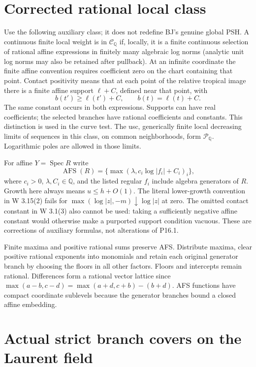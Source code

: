 \documentclass[
  11pt,
]{article}
\begin{document}
\section{Corrected rational local
class}\label{corrected-rational-local-class}

Use the following auxiliary class; it does not redefine BJ's genuine
global PSH. A continuous finite local weight is in
\(\mathcal C_{\mathbb Q}\) if, locally, it is a finite continuous
selection of rational affine expressions in finitely many algebraic log
norms (analytic unit log norms may also be retained after pullback). At
an infinite coordinate the finite affine convention requires coefficient
zero on the chart containing that point. Contact positivity means that
at each point of the relative tropical image there is a finite affine
support \(\ell+C\), defined near that point, with
\[b(t')\ge\ell(t')+C,\qquad b(t)=\ell(t)+C. \tag{9}\] The same constant
occurs in both expressions. Supports can have real coefficients; the
selected branches have rational coefficients and constants. This
distinction is used in the curve test. The usc, generically finite local
decreasing limits of sequences in this class, on common neighborhoods,
form \(\mathcal P_{\mathbb Q}\). Logarithmic poles are allowed in those
limits.

For affine \(Y=\operatorname{Spec}R\) write
\[\operatorname{AFS}(R)=\{\max(\lambda,c_i\log|f_i|+C_i)_i\},\] where
\(c_i>0\), \(\lambda,C_i\in\mathbb Q\), and the listed regular \(f_i\)
include algebra generators of \(R\). Growth here always means
\(u\le h+O(1)\). The literal lower-growth convention in W 3.15(2) fails
for \(\max(\log|z|,-m)\downarrow\log|z|\) at zero. The omitted contact
constant in W 3.1(3) also cannot be used: taking a sufficiently negative
affine constant would otherwise make a purported support condition
vacuous. These are corrections of auxiliary formulas, not alterations of
P16.1.

Finite maxima and positive rational sums preserve AFS. Distribute
maxima, clear positive rational exponents into monomials and retain each
original generator branch by choosing the floors in all other factors.
Floors and intercepts remain rational. Differences form a rational
vector lattice since \(\max(a-b,c-d)=\max(a+d,c+b)-(b+d)\). AFS
functions have compact coordinate sublevels because the generator
branches bound a closed affine embedding.

\section{Actual strict branch covers on the Laurent
field}\label{actual-strict-branch-covers-on-the-laurent-field}
\end{document}
